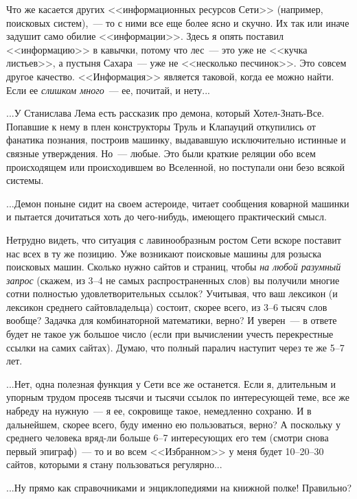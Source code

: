 \documentclass{scrbook}
\newcommand{\flqq}{<<}
\newcommand{\frqq}{>>}
\newcommand{\mdash}{~--- }
\newcommand{\ndash}{--}
\newcommand{\commamdash}{~--- } %
\begin{document}
Что же касается других {\flqq}информационных ресурсов Сети{\frqq} (например, поисковых систем),{\commamdash}то с ними все еще более ясно и скучно. Их так или иначе задушит само обилие {\flqq}информации{\frqq}. Здесь я опять поставил {\flqq}информацию{\frqq} в кавычки, потому что лес{\mdash}это уже не {\flqq}кучка листьев{\frqq}, а пустыня Сахара{\mdash}уже не {\flqq}несколько песчинок{\frqq}. Это совсем другое качество. {\flqq}Информация{\frqq} является таковой, когда ее можно найти. Если ее \emph{слишком много}{\mdash}ее, почитай, и нету...

...У Станислава Лема есть рассказик про демона, который Хотел-Знать-Все. Попавшие к нему в плен конструкторы Труль и Клапауций откупились от фанатика познания, построив машинку, выдававшую исключительно истинные и связные утверждения. Но{\mdash}любые. Это были краткие реляции обо всем происходящем или происходившем во Вселенной, но поступали они безо всякой системы.

...Демон поныне сидит на своем астероиде, читает сообщения коварной машинки и пытается дочитаться хоть до чего-нибудь, имеющего практический смысл.

Нетрудно видеть, что ситуация с лавинообразным ростом Сети вскоре поставит нас всех в ту же позицию. Уже возникают поисковые машины для розыска поисковых машин. Сколько нужно сайтов и страниц, чтобы \emph{на любой разумный запрос} (скажем, из 3{\ndash}4 не самых распространенных слов) вы получили многие сотни полностью удовлетворительных ссылок? Учитывая, что ваш лексикон (и лексикон среднего сайтовладельца) состоит, скорее всего, из 3{\ndash}6 тысяч слов вообще? Задачка для комбинаторной математики, верно? И уверен{\mdash}в ответе будет не такое уж большое число (если при вычислении учесть перекрестные ссылки на самих сайтах). Думаю, что полный паралич наступит через те же 5{\ndash}7 лет.

...Нет, одна полезная функция у Сети все же останется. Если я, длительным и упорным трудом просеяв тысячи и тысячи ссылок по интересующей теме, все же набреду на нужную{\mdash}я ее, сокровище такое, немедленно сохраню. И в дальнейшем, скорее всего, буду именно ею пользоваться, верно? А поскольку у среднего человека вряд-ли больше 6{\ndash}7 интересующих его тем (смотри снова первый эпиграф){\mdash}то и во всем {\flqq}Избранном{\frqq} у меня будет 10{\ndash}20{\ndash}30 сайтов, которыми я стану пользоваться регулярно...

...Ну прямо как справочниками и энциклопедиями на книжной полке! Правильно?
\end{document}
